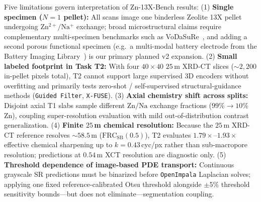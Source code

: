 \documentclass[10pt]{article}
\begin{document}
Five limitations govern interpretation of Zn-13X-Bench results:
(1) \textbf{Single specimen ($N{=}1$ pellet):} All scans image one binderless Zeolite 13X pellet undergoing $\mathrm{Zn^{2+}/Na^+}$ exchange; broad microstructural claims require complementary multi-specimen benchmarks such as VoDaSuRe~\cite{hoeg2026vodasure}, and adding a second porous functional specimen (e.g.\ a multi-modal battery electrode from the Battery Imaging Library~\cite{docherty2026bil}) is our primary planned v2 expansion.
(2) \textbf{Small labeled footprint in Task T2:} With four $40 \times 40$ $25$\,\textmu m XRD-CT slices ($\sim 2{,}200$ in-pellet pixels total), T2 cannot support large supervised 3D encoders without overfitting and primarily tests zero-shot / self-supervised structural-guidance methods (\texttt{Guided Filter}, \texttt{X-FUSE}).
(3) \textbf{Axial chemistry shift across splits:} Disjoint axial T1 slabs sample different $\mathrm{Zn/Na}$ exchange fractions ($99\% \to 10\%$ Zn), coupling super-resolution evaluation with mild out-of-distribution contrast generalization.
(4) \textbf{Finite $25$\,\textmu m chemical resolution:} Because the $25$\,\textmu m XRD-CT reference resolves $\sim 58.5$\,\textmu m ($\mathrm{FRC}_{\mathrm{SB}}(0.5)$), T2 evaluates $1.79\times$--$1.93\times$ effective chemical sharpening up to $k = 0.43$\,cyc/px rather than sub-macropore resolution; predictions at $0.54$\,\textmu m XCT resolution are diagnostic only.
(5) \textbf{Threshold dependence of image-based PDE transport:} Continuous grayscale SR predictions must be binarized before \texttt{OpenImpala} Laplacian solves; applying one fixed reference-calibrated Otsu threshold alongside $\pm 5\%$ threshold sensitivity bounds---but does not eliminate---segmentation coupling.



\end{document}
